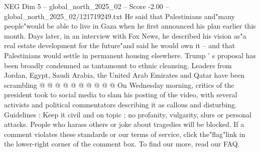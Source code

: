 \begin{textsample}{NEG Dim 5 – global\_north\_2025\_02 – Score -2.00 – global\_north\_2025\_02/121719249.txt}
He said that Palestinians and"many people"would be able to live in Gaza when he first announced his plan earlier this month.
Days later, in an interview with Fox News, he described his vision as"a real estate development for the future"and said he would own it -- and that Palestinians would settle in permanent housing elsewhere.
Trump ' s proposal has been broadly condemned as tantamount to ethnic cleansing.
Leaders from Jordan, Egypt, Saudi Arabia, the United Arab Emirates and Qatar have been scrambling @ @ @ @ @ @ @ @ @ @ On Wednesday morning, critics of the president took to social media to slam his posting of the video, with several activists and political commentators describing it as callous and disturbing.
Guidelines : Keep it civil and on topic ; no profanity, vulgarity, slurs or personal attacks.
People who harass others or joke about tragedies will be blocked.
If a comment violates these standards or our terms of service, click the"flag"link in the lower-right corner of the comment box.
To find our more, read our FAQ.

\end{textsample}
